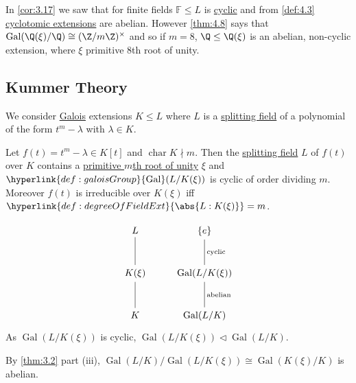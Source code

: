 \documentclass{article}
\DeclareMathOperator{\chara}{char}
\DeclareMathOperator{\Gal}{Gal}
\newcommand{\F}{\mathbb{F}}
\begin{document}
\begin{eg}
    In \cref{cor:3.17} we saw that for finite fields $\F \leq L$ is \hyperlink{def:cyclic}{cyclic} and from \cref{def:4.3} \hyperlink{def:cycloExt}{cyclotomic extensions} are abelian.
    However \cref{thm:4.8} says that $\Gal(\Q(\xi)/\Q) \cong (\Z/m\Z)^\times$ and so if $m=8$, $\Q \leq \Q(\xi)$ is an abelian, non-cyclic extension, where $\xi$ primitive $8$th root of unity.
\end{eg}

\subsection{Kummer Theory}
We consider \hyperlink{def:galoisExt}{Galois} extensions $K \leq L$ where $L$ is a \hyperlink{def:splitting}{splitting field} of a polynomial of the form $t^m - \lambda$ with $\lambda \in K$.

\begin{nthm}\label{thm:4.10}
    Let $f(t) = t^m - \lambda \in K[t]$ and $\chara K \nmid m$.
    Then the \hyperlink{def:splitting}{splitting field} $L$ of $f(t)$ over $K$ contains a \hyperlink{def:primRoot}{primitive $m$th root of unity} $\xi$ and $\hyperlink{def:galoisGroup}{\Gal}(L/K(\xi))$ is cyclic of order dividing $m$.
    Moreover $f(t)$ is irreducible over $K(\xi)$ iff $\hyperlink{def:degreeOfFieldExt}{\abs{L:K(\xi)}} = m$.
\end{nthm}

\begin{remark}
    \begin{equation*}
        \begin{tikzcd}[row sep=large]
            L \arrow[d, no head] & \{e\} \arrow[d, no head, "\text{cyclic}"] \\
            K(\xi) \arrow[d, no head] & \Gal(L/K(\xi)) \arrow[d, no head, "\text{abelian}"] \\
            K & \Gal(L/K)
        \end{tikzcd}
    \end{equation*}
    As $\Gal(L/K(\xi))$ is cyclic, $\Gal(L/K(\xi)) \lhd \Gal(L/K)$.

    By \cref{thm:3.2} part (iii), $\Gal(L/K)/\Gal(L/K(\xi)) \cong \Gal(K(\xi)/K)$ is abelian.
\end{remark}
\end{document}
